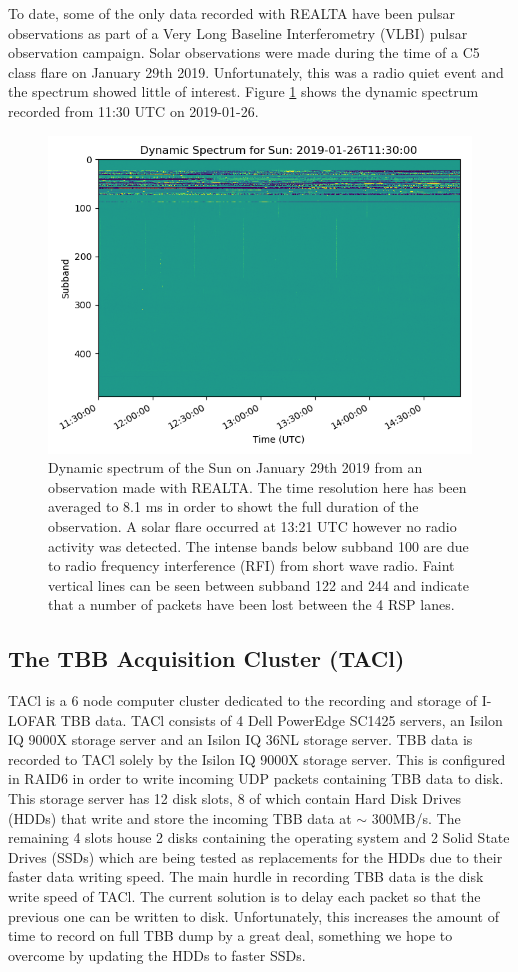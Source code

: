 To date, some of the only data recorded with REALTA have been pulsar observations as part of a Very Long Baseline Interferometry (VLBI) pulsar observation campaign. Solar observations were made during the time of a C5 class flare on January 29th 2019. Unfortunately, this was a radio quiet event and the spectrum showed little of interest. Figure \ref{fig:blank_dspec} shows the dynamic spectrum recorded from 11:30 UTC on 2019-01-26.
\begin{figure}[t]
    \centering
    \includegraphics[width=0.5\columnwidth]{Images/Sun_dspec.png}
    \caption[Dynamic spectrum of the Sun on January 29th 2019.]{Dynamic spectrum of the Sun on January 29th 2019 from an observation made with REALTA. The time resolution here has been averaged to 8.1 ms in order to showt the full duration of the observation. A solar flare occurred at 13:21 UTC however no radio activity was detected. The intense bands below subband 100 are due to radio frequency interference (RFI) from short wave radio. Faint vertical lines can be seen between subband 122 and 244 and indicate that a number of packets have been lost between the 4 RSP lanes.}
    \label{fig:blank_dspec}
\end{figure}

\subsection{The TBB Acquisition Cluster (TACl)}
\label{sec:TACl}
TACl is a 6 node computer cluster dedicated to the recording and storage of I-LOFAR TBB data. TACl consists of 4 Dell PowerEdge SC1425 servers, an Isilon IQ 9000X storage server and an Isilon IQ 36NL storage server.
TBB data is recorded to TACl solely by the Isilon IQ 9000X storage server. This is configured in RAID6 in order to write incoming UDP packets containing TBB data to disk. This storage server has 12 disk slots, 8 of which contain Hard Disk Drives (HDDs) that write and store the incoming TBB data at $\sim$ 300MB/s. The remaining 4 slots house 2 disks containing the operating system and 2 Solid State Drives (SSDs) which are being tested as replacements for the HDDs due to their faster data writing speed. The main hurdle in recording TBB data is the disk write speed of TACl. The current solution is to delay each packet so that the previous one can be written to disk. Unfortunately, this increases the amount of time to record on full TBB dump by a great deal, something we hope to overcome by updating the HDDs to faster SSDs.


